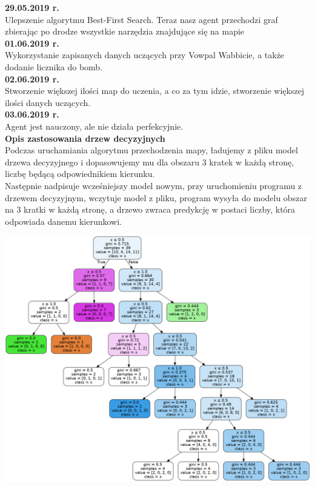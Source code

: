 \documentclass[12pt]{article}
\newcounter{coun}[section]
\begin{document}
\noindent\textbf{29.05.2019 r.}
\setcounter{coun}{0}\\

Ulepszenie algorytmu Best-First Search. Teraz nasz agent przechodzi graf zbierając po drodze wszystkie narzędzia znajdujące się na mapie\\

\noindent\textbf{01.06.2019 r.}
\setcounter{coun}{0}\\

Wykorzystanie zapisanych danych uczących przy Vowpal Wabbicie, a także dodanie licznika do bomb.\\

\noindent\textbf{02.06.2019 r.}
\setcounter{coun}{0}\\

Stworzenie większej ilości map do uczenia, a co za tym idzie, stworzenie większej ilości danych uczących.\\

\noindent\textbf{03.06.2019 r.}
\setcounter{coun}{0}\\

Agent jest nauczony, ale nie działa perfekcyjnie.\\

\noindent \textbf{Opis zastosowania drzew decyzyjnych}\\

Podczas uruchamiania algorytmu przechodzenia mapy, ładujemy z pliku model drzewa decyzyjnego i dopasowujemy mu dla obszaru 3 kratek w każdą stronę, liczbę będącą odpowiednikiem kierunku. \\

Następnie nadpisuje wcześniejszy model nowym, przy uruchomieniu programu z drzewem decyzyjnym, wczytuje model z pliku, program wysyła do modelu obszar na 3 kratki w każdą stronę, a drzewo zwraca predykcję w postaci liczby, która odpowiada danemu kierunkowi. \\ 

\begin{center}
\includegraphics[scale=0.30]{schemat.png}
\end{center}
\end{document}
